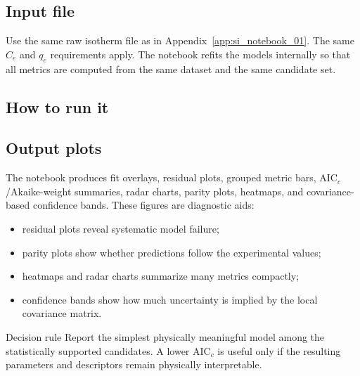 \documentclass[journal=jacsat,manuscript=article]{achemso}
\begin{document}
\subsection*{Input file}

Use the same raw isotherm file as in Appendix~\ref{app:si_notebook_01}.
The same \(C_e\) and \(q_e\) requirements apply. The notebook refits the
models internally so that all metrics are computed from the same dataset and
the same candidate set.

\subsection*{How to run it}


\subsection*{Output plots}

The notebook produces fit overlays, residual plots, grouped metric bars,
AIC$_c$/Akaike-weight summaries, radar charts, parity plots, heatmaps, and
covariance-based confidence bands. These figures are diagnostic aids:
\begin{itemize}
	\item residual plots reveal systematic model failure;
	\item parity plots show whether predictions follow the experimental values;
	\item heatmaps and radar charts summarize many metrics compactly;
	\item confidence bands show how much uncertainty is implied by the local
	covariance matrix.
\end{itemize}

\begin{greenbox}{Decision rule}
	Report the simplest physically meaningful model among the statistically
	supported candidates. A lower AIC$_c$ is useful only if the resulting
	parameters and descriptors remain physically interpretable.
\end{greenbox}
\end{document}
